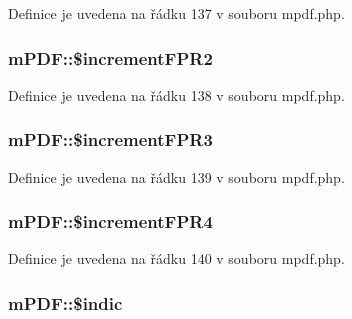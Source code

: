 Definice je uvedena na řádku 137 v souboru mpdf.\-php.

\hypertarget{classm_p_d_f_ae8ad4f2e0f37aa400d8c9ab69f4197a4}{
\subsubsection[{\$increment\-F\-P\-R2}]{\setlength{\rightskip}{0pt plus 5cm}m\-P\-D\-F\-::\$increment\-F\-P\-R2}}\label{classm_p_d_f_ae8ad4f2e0f37aa400d8c9ab69f4197a4}


Definice je uvedena na řádku 138 v souboru mpdf.\-php.

\hypertarget{classm_p_d_f_ad3500bbd5ac5c965c69cbdbf134e6770}{
\subsubsection[{\$increment\-F\-P\-R3}]{\setlength{\rightskip}{0pt plus 5cm}m\-P\-D\-F\-::\$increment\-F\-P\-R3}}\label{classm_p_d_f_ad3500bbd5ac5c965c69cbdbf134e6770}


Definice je uvedena na řádku 139 v souboru mpdf.\-php.

\hypertarget{classm_p_d_f_a4bf8be1f372be91f8f00278721abf039}{
\subsubsection[{\$increment\-F\-P\-R4}]{\setlength{\rightskip}{0pt plus 5cm}m\-P\-D\-F\-::\$increment\-F\-P\-R4}}\label{classm_p_d_f_a4bf8be1f372be91f8f00278721abf039}


Definice je uvedena na řádku 140 v souboru mpdf.\-php.

\hypertarget{classm_p_d_f_ab06a380500c6726a902fce12049f18b5}{
\subsubsection[{\$indic}]{\setlength{\rightskip}{0pt plus 5cm}m\-P\-D\-F\-::\$indic}}\label{classm_p_d_f_ab06a380500c6726a902fce12049f18b5}


